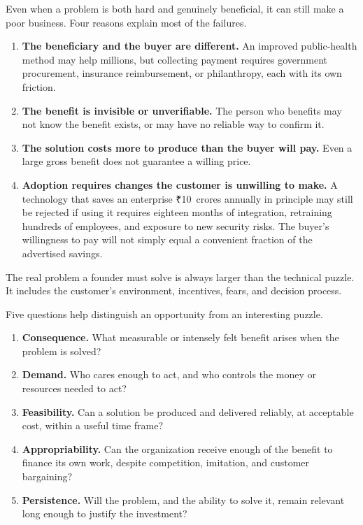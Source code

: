 Even when a problem is both hard and genuinely beneficial, it can still make a poor business. Four reasons explain most of the failures.

\begin{enumerate}
  \item \textbf{The beneficiary and the buyer are different.} An improved public-health method may help millions, but collecting payment requires government procurement, insurance reimbursement, or philanthropy, each with its own friction.
  \item \textbf{The benefit is invisible or unverifiable.} The person who benefits may not know the benefit exists, or may have no reliable way to confirm it.
  \item \textbf{The solution costs more to produce than the buyer will pay.} Even a large gross benefit does not guarantee a willing price.
  \item \textbf{Adoption requires changes the customer is unwilling to make.} A technology that saves an enterprise \mbox{₹10 crores} annually in principle may still be rejected if using it requires eighteen months of integration, retraining hundreds of employees, and exposure to new security risks. The buyer's willingness to pay will not simply equal a convenient fraction of the advertised savings.
\end{enumerate}

The real problem a founder must solve is always larger than the technical puzzle. It includes the customer's environment, incentives, fears, and decision process.

Five questions help distinguish an opportunity from an interesting puzzle.

\begin{enumerate}
  \item \textbf{Consequence.} What measurable or intensely felt benefit arises when the problem is solved?
  \item \textbf{Demand.} Who cares enough to act, and who controls the money or resources needed to act?
  \item \textbf{Feasibility.} Can a solution be produced and delivered reliably, at acceptable cost, within a useful time frame?
  \item \textbf{Appropriability.} Can the organization receive enough of the benefit to finance its own work, despite competition, imitation, and customer bargaining?
  \item \textbf{Persistence.} Will the problem, and the ability to solve it, remain relevant long enough to justify the investment?
\end{enumerate}

